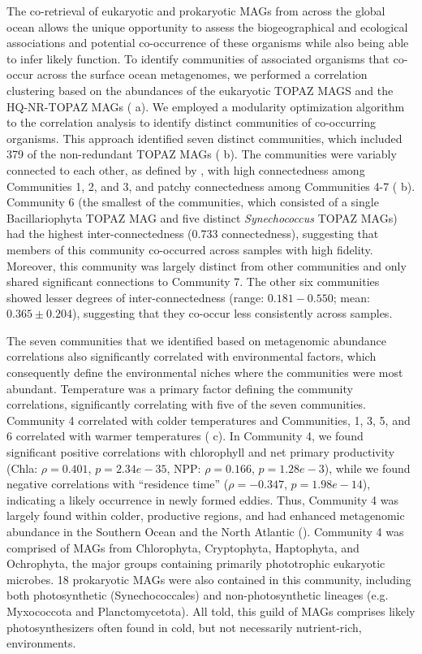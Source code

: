 \documentclass[12pt]{article}
\numberwithin{equation}{section}
\begin{document}
The co-retrieval of eukaryotic and prokaryotic MAGs from across the global ocean allows the unique opportunity to assess the biogeographical and ecological associations and potential co-occurrence of these organisms while also being able to infer likely function. To identify communities of associated organisms that co-occur across the surface ocean metagenomes, we performed a correlation clustering based on the abundances of the eukaryotic TOPAZ MAGS and the HQ-NR-TOPAZ MAGs ( a). We employed a modularity optimization algorithm to the correlation analysis \cite{blondel2008fast} to identify distinct communities of co-occurring organisms. This approach identified seven distinct communities, which included 379 of the non-redundant TOPAZ MAGs ( b). The communities were variably connected to each other, as defined by , with high connectedness among Communities 1, 2, and 3, and patchy connectedness among Communities 4-7 ( b). Community 6 (the smallest of the communities, which consisted of a single Bacillariophyta TOPAZ MAG and five distinct \textit{Synechococcus} TOPAZ MAGs) had the highest inter-connectedness (0.733 connectedness), suggesting that members of this community co-occurred across samples with high fidelity. Moreover, this community was largely distinct from other communities and only shared significant connections to Community 7. The other six communities showed lesser degrees of inter-connectedness (range: $0.181-0.550$; mean: $0.365\pm0.204$), suggesting that they co-occur less consistently across samples. 

The seven communities that we identified based on metagenomic abundance correlations also significantly correlated with environmental factors, which consequently define the environmental niches where the communities were most abundant. Temperature was a primary factor defining the community correlations, significantly correlating with five of the seven communities. Community 4 correlated with colder temperatures and Communities, 1, 3, 5, and 6 correlated with warmer temperatures ( c). In Community 4, we found significant positive correlations with chlorophyll and net primary productivity (Chla: $\rho=0.401$, $p=2.34e-35$, NPP: $\rho=0.166$, $p=1.28e-3$), while we found negative correlations with ``residence time'' ($\rho=-0.347$, $p=1.98e-14$), indicating a likely occurrence in newly formed eddies. Thus, Community 4 was largely found within colder, productive regions, and had enhanced metagenomic abundance in the Southern Ocean and the North Atlantic (). Community 4 was comprised of MAGs from Chlorophyta, Cryptophyta, Haptophyta, and Ochrophyta, the major groups containing primarily phototrophic eukaryotic microbes. 18 prokaryotic MAGs were also contained in this community, including both photosynthetic (Synechococcales) and non-photosynthetic lineages (e.g. Myxococcota and Planctomycetota). All told, this guild of MAGs comprises likely photosynthesizers often found in cold, but not necessarily nutrient-rich, environments. 
\end{document}

